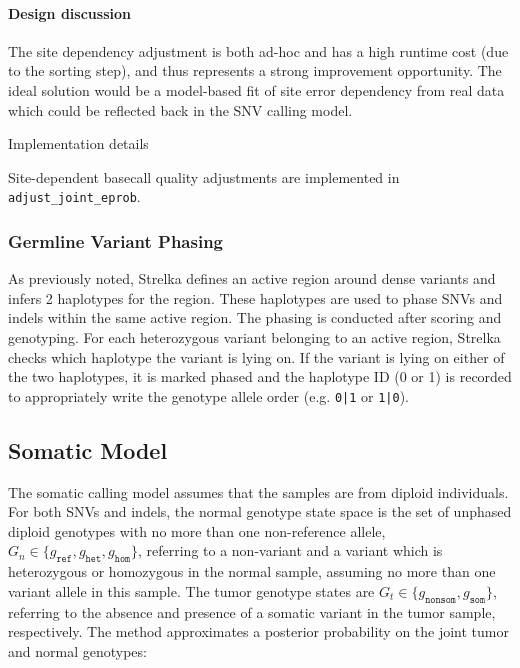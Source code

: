 \documentclass{article}
\newenvironment{raggedParagraph}[1]
{
    \begin{paragraph} {#1}
        \raggedright
    }
    {
    \end{paragraph}
}
\begin{document}
\paragraph{Design discussion}

The site dependency adjustment is both ad-hoc and has a high runtime cost (due to the sorting step), and thus represents a strong improvement opportunity. The ideal solution would be a model-based fit of site error dependency from real data which could be reflected back in the SNV calling model.

\begin{raggedParagraph}{Implementation details}

Site-dependent basecall quality adjustments are implemented in \verb|adjust_joint_eprob|.

\end{raggedParagraph}

\fi %


\subsubsection{Germline Variant Phasing}
\label{sec:ReadBackedPhasing}
As previously noted, Strelka defines an active region around dense variants and infers 2 haplotypes for the region. These haplotypes are used to phase SNVs and indels within the same active region. The phasing is conducted after scoring and genotyping. For each heterozygous variant belonging to an active region, Strelka checks which haplotype the variant is lying on. If the variant is lying on either of the two haplotypes, it is marked phased and the haplotype ID (0 or 1) is recorded to appropriately write the genotype allele order (e.g. \verb/0|1/ or \verb/1|0/).


\subsection{Somatic Model}
\label{sec:somatic}

The somatic calling model assumes that the samples are from diploid individuals. For both SNVs and indels, the normal genotype state space is the set of unphased diploid genotypes with no more than one non-reference allele, $G_n \in \{ g_\texttt{ref}, g_\texttt{het}, g_\texttt{hom}\}$, referring to a non-variant and a variant which is heterozygous or homozygous in the normal sample, assuming no more than one variant allele in this sample. The tumor genotype states are $G_t \in \{ g_\texttt{nonsom}, g_\texttt{som} \}$, referring to the absence and presence of a somatic variant in the tumor sample, respectively. The method approximates a posterior probability on the joint tumor and normal genotypes:
\end{document}
